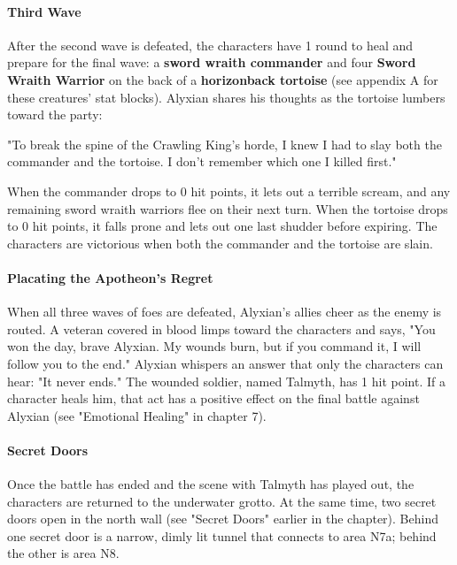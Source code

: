 \documentclass[10pt,a4paper,twoside,twocolumn,openany,nodeprecatedcode]{dndbook}
\begin{document}
\paragraph{Third Wave}
After the second wave is defeated, the characters have 1 round to heal and prepare for the final wave: a \textbf{sword wraith commander} and four \textbf{Sword Wraith Warrior} on the back of a \textbf{horizonback tortoise} (see appendix A for these creatures' stat blocks). Alyxian shares his thoughts as the tortoise lumbers toward the party:

\begin{DndReadAloud}{}
"To break the spine of the Crawling King's horde, I knew I had to slay both the commander and the tortoise. I don't remember which one I killed first."

\end{DndReadAloud}

When the commander drops to 0 hit points, it lets out a terrible scream, and any remaining sword wraith warriors flee on their next turn. When the tortoise drops to 0 hit points, it falls prone and lets out one last shudder before expiring. The characters are victorious when both the commander and the tortoise are slain.

\paragraph{Placating the Apotheon's Regret}
When all three waves of foes are defeated, Alyxian's allies cheer as the enemy is routed. A veteran covered in blood limps toward the characters and says, "You won the day, brave Alyxian. My wounds burn, but if you command it, I will follow you to the end." Alyxian whispers an answer that only the characters can hear: "It never ends." The wounded soldier, named Talmyth, has 1 hit point. If a character heals him, that act has a positive effect on the final battle against Alyxian (see "Emotional Healing" in chapter 7).

\paragraph{Secret Doors}
Once the battle has ended and the scene with Talmyth has played out, the characters are returned to the underwater grotto. At the same time, two secret doors open in the north wall (see "Secret Doors" earlier in the chapter). Behind one secret door is a narrow, dimly lit tunnel that connects to area N7a; behind the other is area N8.
\end{document}
